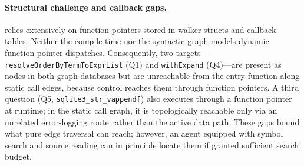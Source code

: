 \paragraph{Structural challenge and callback gaps.}
\sqlite relies extensively on function pointers stored in walker structs and callback tables.
Neither the compile-time nor the syntactic graph models dynamic function-pointer dispatches.
Consequently, two targets---\texttt{resolveOrderByTermToExprList} (Q1) and
\texttt{withExpand} (Q4)---are present as nodes in both graph databases but are
unreachable from the entry function along static call edges, because control reaches
them through function pointers.
A third question (Q5, \texttt{sqlite3\_str\_vappendf}) also executes through a function
pointer at runtime; in the static call graph, it is topologically reachable only via an
unrelated error-logging route rather than the active data path.
These gaps bound what pure edge traversal can reach; however, an agent equipped with
symbol search and source reading can in principle locate them if granted sufficient search budget.
